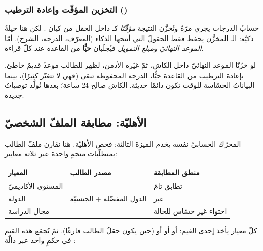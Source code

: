 \subsubsection{التخزين المؤقّت وإعادة الترطيب ()}

حسابُ الدرجات يجري مرّةً وتُخزَّن النتيجة \emph{مؤقّتًا} كـ  داخل الحقل
 من كيان . لكن هنا حيلةٌ ذكيّة: الـ 
المخزَّن يحفظ فقط الحقولَ التي أنتجها الذكاء (المعرّف، الدرجة، الشرح). أمّا
\emph{الموعد النهائيّ} و\emph{مبلغ التمويل} فيُجلَبان \textbf{حيًّا} من القاعدة عند
كلّ قراءة.

\begin{keyp}
لو خزّنّا الموعد النهائيّ داخل الكاش، ثمّ غيّره الأدمن، لظهر للطالب موعدٌ قديمٌ خاطئ.
بإعادة الترطيب من القاعدة حيًّا، الدرجة المحفوظة تبقى (فهي لا تتغيّر كثيرًا)، بينما
البياناتُ الحسّاسة للوقت تكون دائمًا حديثة. الكاش صالح 24 ساعة؛ بعدها تُولَّد توصياتٌ
جديدة.
\end{keyp}

\subsection{الأهليّة: مطابقة الملفّ الشخصيّ}

المحرّك الحسابيّ نفسه يخدم الميزة الثالثة: فحص الأهليّة. هنا نقارن ملفّ الطالب
بمتطلّبات منحةٍ واحدة عبر ثلاثة معايير:

\begin{center}
\begin{tabular}{L{3.2cm} L{4.4cm} L{4.6cm}}
\toprule
\textbf{\color{spPrimary}المعيار} & \textbf{\color{spPrimary}مصدر الطالب} & \textbf{\color{spPrimary}منطق المطابقة} \\
\midrule
المستوى الأكاديميّ &  & تطابق تامّ \\
الدولة & الدول المفضّلة + الجنسيّة & عبر  \\
مجال الدراسة &  & احتواء غير حسّاس للحالة \\
\bottomrule
\end{tabular}
\end{center}

كلّ معيار يأخذ إحدى القيم:  أو  أو  أو
 (حين يكون حقلُ الطالب فارغًا). ثمّ تُجمَع هذه القيم في حكمٍ واحد عبر
دالّة :

